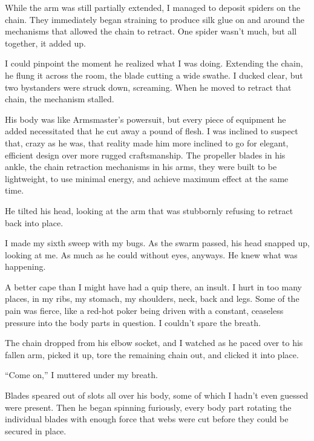 While the arm was still partially extended, I managed to deposit spiders on the chain.  They immediately began straining to produce silk glue on and around the mechanisms that allowed the chain to retract.  One spider wasn't much, but all together, it added up.



I could pinpoint the moment he realized what I was doing.  Extending the chain, he flung it across the room, the blade cutting a wide swathe.  I ducked clear, but two bystanders were struck down, screaming.  When he moved to retract that chain, the mechanism stalled.



His body was like Armsmaster's powersuit, but every piece of equipment he added necessitated that he cut away a pound of flesh.  I was inclined to suspect that, crazy as he was, that reality made him more inclined to go for elegant, efficient design over more rugged craftsmanship.  The propeller blades in his ankle, the chain retraction mechanisms in his arms, they were built to be lightweight, to use minimal energy, and achieve maximum effect at the same time.



He tilted his head, looking at the arm that was stubbornly refusing to retract back into place.



I made my sixth sweep with my bugs.  As the swarm passed, his head snapped up, looking at me.  As much as he could without eyes, anyways.  He knew what was happening.



A better cape than I might have had a quip there, an insult.  I hurt in too many places, in my ribs, my stomach, my shoulders, neck, back and legs.  Some of the pain was fierce, like a red-hot poker being driven with a constant, ceaseless pressure into the body parts in question.  I couldn't spare the breath.



The chain dropped from his elbow socket, and I watched as he paced over to his fallen arm, picked it up, tore the remaining chain out, and clicked it into place.



``Come on,'' I muttered under my breath.



Blades speared out of slots all over his body, some of which I hadn't even guessed were present.  Then he began spinning furiously, every body part rotating the individual blades with enough force that webs were cut before they could be secured in place.



